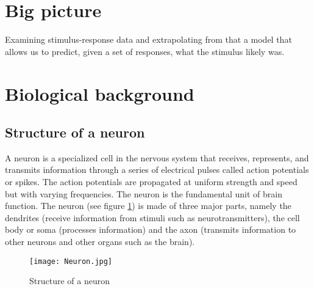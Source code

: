 
\section{Big picture}
 
Examining stimulus-response data and extrapolating from that a model
that allows us to predict, given a set of responses, what the stimulus 
likely was.





\section{Biological background}
\subsection{Structure of a neuron}
A neuron is a specialized cell in the nervous system that receives, represents, and transmits information through a series of electrical pulses called action potentials or spikes. The action potentials are propagated at uniform strength and speed but with varying frequencies. The neuron is the fundamental unit of brain function. The neuron (see  figure \ref{fig:Neuron}) is made of three major parts, namely the dendrites (receive information from stimuli such as neurotransmitters), the cell body or soma (processes information) and the axon (transmits information to other neurons and other organs such as the brain).

\begin{figure}[h]
\caption{Structure of  a neuron}
\texttt{[image: Neuron.jpg]}
      \label{fig:Neuron}
\end{figure}


